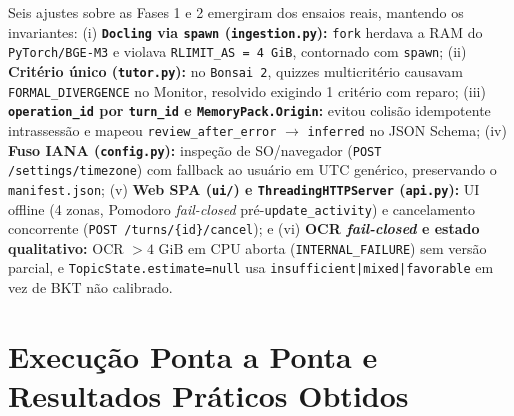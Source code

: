 \documentclass[12pt,a4paper]{article}
\newcommand{\code}[1]{\nolinkurl{#1}}
\begin{document}
Seis ajustes sobre as Fases 1 e 2 emergiram dos ensaios reais, mantendo os invariantes: (i) \textbf{\code{Docling} via \code{spawn} (\code{ingestion.py}):} \code{fork} herdava a RAM do \code{PyTorch/BGE-M3} e violava \code{RLIMIT\_AS = 4 GiB}, contornado com \code{spawn}; (ii) \textbf{Critério único (\code{tutor.py}):} no \code{Bonsai 2}, quizzes multicritério causavam \code{FORMAL\_DIVERGENCE} no Monitor, resolvido exigindo 1 critério com reparo; (iii) \textbf{\code{operation\_id} por \code{turn\_id} e \code{MemoryPack.Origin}:} evitou colisão idempotente intrassessão e mapeou \code{review\_after\_error} $\rightarrow$ \code{inferred} no JSON Schema; (iv) \textbf{Fuso IANA (\code{config.py}):} inspeção de SO/navegador (\code{POST /settings/timezone}) com fallback ao usuário em UTC genérico, preservando o \code{manifest.json}; (v) \textbf{Web SPA (\code{ui/}) e \code{ThreadingHTTPServer} (\code{api.py}):} UI offline (4 zonas, Pomodoro \textit{fail-closed} pré-\code{update\_activity}) e cancelamento concorrente (\code{POST /turns/\{id\}/cancel}); e (vi) \textbf{OCR \textit{fail-closed} e estado qualitativo:} OCR $>4\text{ GiB}$ em CPU aborta (\code{INTERNAL\_FAILURE}) sem versão parcial, e \code{TopicState.estimate=null} usa \code{insufficient|mixed|favorable} em vez de BKT não calibrado.

\section{Execução Ponta a Ponta e Resultados Práticos Obtidos}
\label{sec:resultados-praticos}
\end{document}
